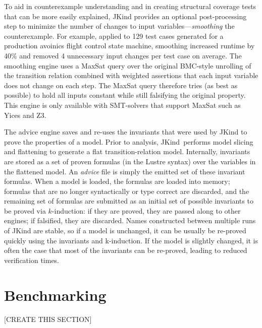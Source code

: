 \documentclass{llncs}
\newcommand{\jkind}{{\sc JKind}\xspace}
\newcommand{\lustre}{{\sc Lustre}\xspace}
\renewcommand{\paragraph}[1]{\vspace{5pt}\noindent {\bf #1}}
\begin{document}
\paragraph{Smoothing.}  To aid in counterexample understanding and in
creating structural coverage tests that can be more easily explained,
\jkind provides an optional post-processing step to minimize the
number of changes to input variables---{\em smoothing} the
counterexample.  For example, applied to 129 test cases generated for
a production avoinics flight control state machine, smoothing
increased runtime by 40\% and removed 4 unnecessary input changes per
test case on average.  The smoothing engine uses a {\sc MaxSat} query
over the original BMC-style unrolling of the transition relation
combined with weighted assertions that each input variable does not
change on each step. The {\sc MaxSat} query therefore tries (as best
as possible) to hold all inputs constant while still falsifying the
original property. This engine is only available with SMT-solvers that
support {\sc MaxSat} such as Yices and Z3.

\paragraph{Advice.} The advice engine saves and re-uses the invariants that were used by \jkind to prove the properties of a model.  Prior to analysis, \jkind\ performs model slicing and flattening to generate a flat transition-relation model.  Internally, invariants are stored as a set of proven formulas (in the \lustre syntax) over the variables in the flattened model.  An {\em advice} file is simply the emitted set of these invariant formulas.  When a model is loaded, the formulas are loaded into memory; formulas that are no longer syntactically or type correct are discarded, and the remaining set of formulas are submitted as an initial set of possible invariants to be proved via $k$-induction: if they are proved, they are passed along to other engines; if falsified, they are discarded.
%
Names constructed between multiple runs of \jkind are stable, so if a
model is unchanged, it can be usually be re-proved quickly using the
invariants and k-induction.  If the model is slightly changed, it is
often the case that most of the invariants can be re-proved, leading
to reduced verification times.

\section{Benchmarking}
[CREATE THIS SECTION]
\end{document}
